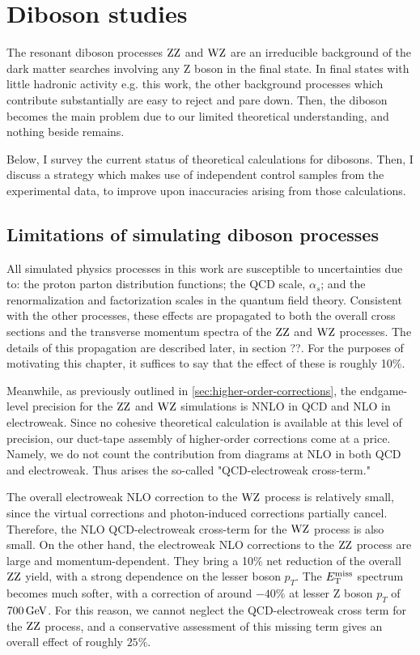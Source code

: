 \chapter{Diboson studies}
\label{chap:dibosons}

The resonant diboson processes $\mathrm{Z}\mathrm{Z}$ and $\mathrm{W}\mathrm{Z}$ are an irreducible background of the
dark matter searches involving any Z boson in the final state.
In final states with little hadronic activity e.g. this work, 
the other background processes which contribute substantially are easy to reject and pare down.
Then, the diboson becomes the main problem due to our limited theoretical understanding, and nothing beside remains.

Below, I survey the current status of theoretical calculations for dibosons. 
Then, I discuss a strategy which makes use of independent control samples from the experimental data,
to improve upon inaccuracies arising from those calculations.

\section{Limitations of simulating diboson processes}
\label{sec:vvtheo}
All simulated physics processes in this work are susceptible to uncertainties due to: the proton parton distribution functions; the QCD scale, $\alpha_s$; and the renormalization and factorization scales in the quantum field theory.
Consistent with the other processes, these effects are propagated to both the overall cross sections and the transverse momentum spectra of the $\mathrm{Z}\mathrm{Z}$ and $\mathrm{W}\mathrm{Z}$ processes.
The details of this propagation are described later, in section ??.
For the purposes of motivating this chapter, it suffices to say that the effect of these is roughly 10\%. 

Meanwhile, as previously outlined in \ref{sec:higher-order-corrections}, the endgame-level precision for the $\mathrm{Z}\mathrm{Z}$ and $\mathrm{W}\mathrm{Z}$ simulations is NNLO in QCD and NLO in electroweak.
Since no cohesive theoretical calculation is available at this level of precision, our duct-tape assembly of higher-order corrections come at a price.
Namely, we do not count the contribution from diagrams at NLO in both QCD and electroweak. Thus arises the so-called "QCD-electroweak cross-term."

The overall electroweak NLO correction to the $\mathrm{W}\mathrm{Z}$ process is relatively small, since the virtual corrections and photon-induced corrections partially cancel.
Therefore, the NLO QCD-electroweak cross-term for the $\mathrm{W}\mathrm{Z}$ process is also small.
On the other hand, the electroweak NLO corrections to the $\mathrm{Z}\mathrm{Z}$ process are large and momentum-dependent.
They bring a 10\% net reduction of the overall $\mathrm{Z}\mathrm{Z}$ yield, with a strong dependence on the lesser boson $p_T$.
The $E_\mathrm{T}^{\mathrm{miss}}$ spectrum becomes much softer, with a correction of around $-40\%$ at lesser Z boson $p_T$ of $700 \,\text{Ge\hspace{-.08em}V}$.
For this reason, we cannot neglect the QCD-electroweak cross term for the $\mathrm{Z}\mathrm{Z}$ process, and a conservative
assessment of this missing term gives an overall effect of roughly $25\%$.


